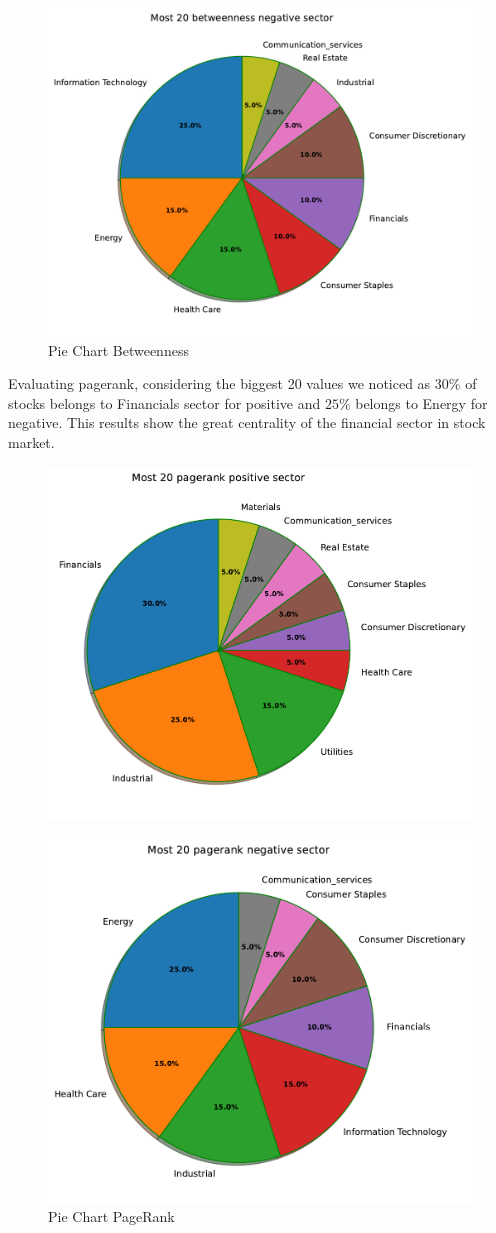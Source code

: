 \documentclass[sigchi]{acmart}
\begin{document}
\begin{figure}[h]
	\centering
	\includegraphics[width=0.65\linewidth]{plot/pie_bet_neg.pdf}
	\caption{Pie Chart Betweenness}
\end{figure}
Evaluating pagerank, considering the biggest 20 values we noticed as $30\%$ of stocks belongs to Financials sector for positive and $25\%$ belongs to Energy for negative. This results show the great centrality of the financial sector in stock market.
\begin{figure}[H]
	\centering
	\includegraphics[width=0.65\linewidth]{plot/pie_page_pos.pdf}
\end{figure}
\begin{figure}[H]
	\centering
	\includegraphics[width=0.65\linewidth]{plot/pie_page_neg.pdf}
	\caption{Pie Chart PageRank}
\end{figure}
\end{document}
